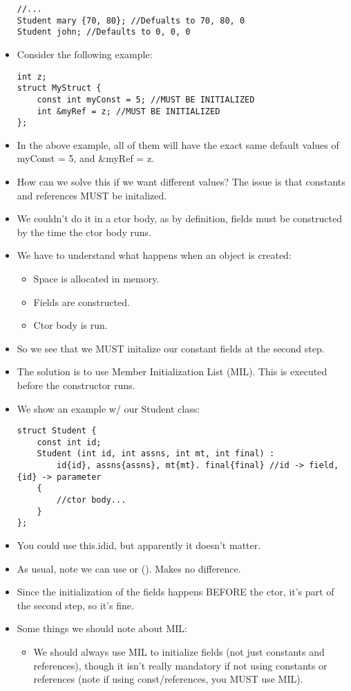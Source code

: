 \documentclass{article}
\begin{document}
\begin{itemize}
\begin{lstlisting}
//...
Student mary {70, 80}; //Defualts to 70, 80, 0
Student john; //Defaults to 0, 0, 0
\end{lstlisting}
\item Consider the following example:
\begin{lstlisting}
int z;
struct MyStruct {
    const int myConst = 5; //MUST BE INITIALIZED
    int &myRef = z; //MUST BE INITIALIZED
};
\end{lstlisting}
\item In the above example, all of them will have the exact same default values of myConst = 5, and \&myRef = z.
\item How can we solve this if we want different values?  The issue is that constants and references MUST be initalized.
\item We couldn't do it in a ctor body, as by definition, fields must be constructed by the time the ctor body runs.
\item We have to understand what happens when an object is created:
\begin{itemize}
\item Space is allocated in memory.
\item Fields are constructed.
\item Ctor body is run.
\end{itemize}
\item So we see that we MUST initalize our constant fields at the second step.
\item The solution is to use Member Initialization List (MIL).  This is executed before the constructor runs.
\item We show an example w/ our Student class:
\begin{lstlisting}
struct Student {
    const int id;
    Student (int id, int assns, int mt, int final) :
        id{id}, assns{assns}, mt{mt}. final{final} //id -> field, {id} -> parameter
    {
        //ctor body...
    }
};
\end{lstlisting}
\item You could use this.id{id}, but apparently it doesn't matter.
\item As usual, note we can use {} or ().  Makes no difference.
\item Since the initialization of the fields happens BEFORE the ctor, it's part of the second step, so it's fine.
\item Some things we should note about MIL:
\begin{itemize}
\item We should always use MIL to initialize fields (not just constants and references), though it isn't really mandatory if not using constants or references (note if using const/references, you MUST use MIL).

\end{itemize}
\end{itemize}
\end{document}
